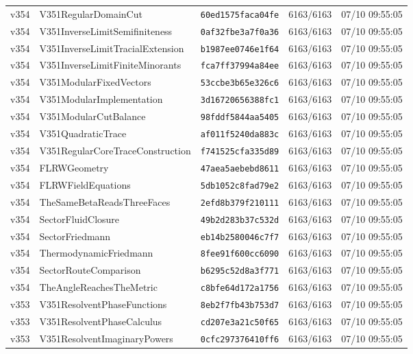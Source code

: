 \documentclass[11pt]{article}
\theoremstyle{definition}\newtheorem{deriv}{Derivação}
\begin{document}
{\begin{longtable}{@{}lllll@{}}
v354 & V351RegularDomainCut & \texttt{60ed1575faca04fe} & 6163/6163 & 07/10 09:55:05 \\
v354 & V351InverseLimitSemifiniteness & \texttt{0af32fbe3a7f0a36} & 6163/6163 & 07/10 09:55:05 \\
v354 & V351InverseLimitTracialExtension & \texttt{b1987ee0746e1f64} & 6163/6163 & 07/10 09:55:05 \\
v354 & V351InverseLimitFiniteMinorants & \texttt{fca7ff37994a84ee} & 6163/6163 & 07/10 09:55:05 \\
v354 & V351ModularFixedVectors & \texttt{53ccbe3b65e326c6} & 6163/6163 & 07/10 09:55:05 \\
v354 & V351ModularImplementation & \texttt{3d16720656388fc1} & 6163/6163 & 07/10 09:55:05 \\
v354 & V351ModularCutBalance & \texttt{98fddf5844aa5405} & 6163/6163 & 07/10 09:55:05 \\
v354 & V351QuadraticTrace & \texttt{af011f5240da883c} & 6163/6163 & 07/10 09:55:05 \\
v354 & V351RegularCoreTraceConstruction & \texttt{f741525cfa335d89} & 6163/6163 & 07/10 09:55:05 \\
v354 & FLRWGeometry & \texttt{47aea5aebebd8611} & 6163/6163 & 07/10 09:55:05 \\
v354 & FLRWFieldEquations & \texttt{5db1052c8fad79e2} & 6163/6163 & 07/10 09:55:05 \\
v354 & TheSameBetaReadsThreeFaces & \texttt{2efd8b379f210111} & 6163/6163 & 07/10 09:55:05 \\
v354 & SectorFluidClosure & \texttt{49b2d283b37c532d} & 6163/6163 & 07/10 09:55:05 \\
v354 & SectorFriedmann & \texttt{eb14b2580046c7f7} & 6163/6163 & 07/10 09:55:05 \\
v354 & ThermodynamicFriedmann & \texttt{8fee91f600cc6090} & 6163/6163 & 07/10 09:55:05 \\
v354 & SectorRouteComparison & \texttt{b6295c52d8a3f771} & 6163/6163 & 07/10 09:55:05 \\
v354 & TheAngleReachesTheMetric & \texttt{c8bfe64d172a1756} & 6163/6163 & 07/10 09:55:05 \\
v353 & V351ResolventPhaseFunctions & \texttt{8eb2f7fb43b753d7} & 6163/6163 & 07/10 09:55:05 \\
v353 & V351ResolventPhaseCalculus & \texttt{cd207e3a21c50f65} & 6163/6163 & 07/10 09:55:05 \\
v353 & V351ResolventImaginaryPowers & \texttt{0cfc297376410ff6} & 6163/6163 & 07/10 09:55:05 \\

\end{longtable}}
\end{document}
